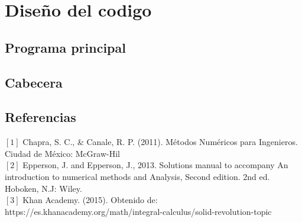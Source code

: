 \documentclass[10pt]{article}
\begin{document}
	\section{Diseño del codigo} 
		\subsection{Programa principal}
			
		\subsection{Cabecera}
			
	\begin{multicols}{2} 
		\section{Referencias} 
			$[1]$ Chapra, S. C., \& Canale, R. P. (2011). Métodos Numéricos para Ingenieros. Ciudad de México: McGraw-Hil \\
			
			$[2]$ Epperson, J. and Epperson, J., 2013. Solutions manual to accompany An introduction to numerical methods and Analysis, Second edition. 2nd ed. Hoboken, N.J: Wiley. \\
			
			$[3]$ Khan Academy. (2015). Obtenido de:\\ https://es.khanacademy.org/math/integral-calculus/solid-revolution-topic\\
	\end{multicols} 
\end{document}
